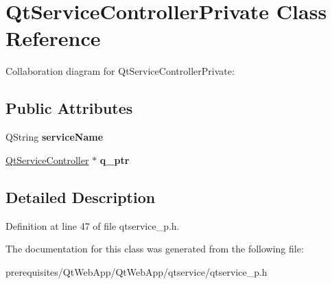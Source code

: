 \hypertarget{class_qt_service_controller_private}{}\section{Qt\+Service\+Controller\+Private Class Reference}
\label{class_qt_service_controller_private}


Collaboration diagram for Qt\+Service\+Controller\+Private\+:
\subsection*{Public Attributes}
\begin{DoxyCompactItemize}
\item 
\mbox{\label{class_qt_service_controller_private_ab0c1b3e4f6189e131073b85d869a9823}} 
Q\+String {\bfseries service\+Name}
\item 
\mbox{\label{class_qt_service_controller_private_ac02268c462ca6440fddb3c319639da11}} 
\mbox{\hyperlink{class_qt_service_controller}{Qt\+Service\+Controller}} $\ast$ {\bfseries q\+\_\+ptr}
\end{DoxyCompactItemize}


\subsection{Detailed Description}


Definition at line 47 of file qtservice\+\_\+p.\+h.



The documentation for this class was generated from the following file\+:\begin{DoxyCompactItemize}
\item 
prerequisites/\+Qt\+Web\+App/\+Qt\+Web\+App/qtservice/qtservice\+\_\+p.\+h\end{DoxyCompactItemize}
